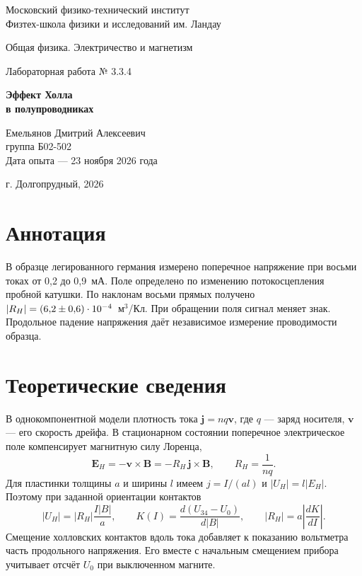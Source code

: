 \documentclass[a4paper,12pt]{article}
\begin{document}
\begin{titlepage}
\centering
{\large Московский физико-технический институт\\[4pt]
Физтех-школа физики и исследований им. Ландау\par}
\vfill
{\Large Общая физика. Электричество и магнетизм\par}
\vspace{1cm}
{\Large Лабораторная работа № 3.3.4\par}
\vspace{.5cm}
{\huge\bfseries Эффект Холла\\ в полупроводниках\par}
\vfill
\begin{flushright}
Емельянов Дмитрий Алексеевич\\
группа Б02-502\\[6pt]
Дата опыта — 23 ноября 2026 года
\end{flushright}
\vfill
г. Долгопрудный, 2026
\end{titlepage}

\section{Аннотация}
В образце легированного германия измерено поперечное напряжение при восьми токах от 0,2 до 0,9~мА. Поле определено по изменению потокосцепления пробной катушки. По наклонам восьми прямых получено $|R_H|=(6{,}2 \pm 0{,}6)\cdot10^{-4}$~м$^3$/Кл. При обращении поля сигнал меняет знак. Продольное падение напряжения даёт независимое измерение проводимости образца.

\section{Теоретические сведения}
В однокомпонентной модели плотность тока $\mathbf j=nq\mathbf v$, где $q$ — заряд носителя, $\mathbf v$ — его скорость дрейфа. В стационарном состоянии поперечное электрическое поле компенсирует магнитную силу Лоренца,
\[
\mathbf E_H=-\mathbf v\times\mathbf B
=-R_H\,\mathbf j\times\mathbf B,\qquad R_H=\frac{1}{nq}.
\]
Для пластинки толщины $a$ и ширины $l$ имеем $j=I/(al)$ и $|U_H|=l|E_H|$. Поэтому при заданной ориентации контактов
\begin{equation}
 |U_H|=|R_H|\frac{I|B|}{a},\qquad
 K(I)=\frac{d(U_{34}-U_0)}{d|B|},\qquad
 |R_H|=a\left|\frac{dK}{dI}\right|. \label{eq:hall}
\end{equation}
Смещение холловских контактов вдоль тока добавляет к показанию вольтметра часть продольного напряжения. Его вместе с начальным смещением прибора учитывает отсчёт $U_0$ при выключенном магните.
\end{document}
